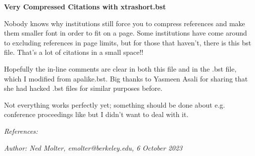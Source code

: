 \documentclass[11pt]{article}
\begin{document}
\begin{center}
	\textbf{Very Compressed Citations with xtrashort.bst}
\end{center}

\justification

Nobody knows why institutions still force you to compress references and make them smaller font in order to fit on a page. Some institutions have come around to excluding references in page limits, but for those that haven't, there is this bst file. That's a lot of citations in a small space!\citep{akins23, allison91, arras21, atreya20, aurnou07, beebe05, brogan18, lellouch07, sherjal95,  esposito91, teca}!

Hopefully the in-line comments are clear in both this file and in the .bst file, which I modified from apalike.bst. Big thanks to Yasmeen Asali for sharing that she had hacked .bst files for similar purposes before.

Not everything works perfectly yet; something should be done about e.g. conference proceedings like \citep{thatte15} but I didn't want to deal with it.



\renewenvironment*{thebibliography}{
   \pointlessenum
   \begin{inparaenum}
   \renewcommand\makelabel[1]{  \textbf{[##1]}}
}{\end{inparaenum}}

\begin{flushleft}
\footnotesize{
\textit{References:}
{} 
}
\end{flushleft}

\vspace{2cm}
\noindent\textit{
Author: Ned Molter, emolter@berkeley.edu, 6 October 2023
}
\end{document}
